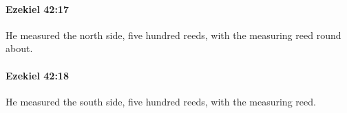 		\paragraph{Ezekiel 42:17} %
			\label{EZEKIEL-42-17}

			He measured the north side, five hundred reeds, with the measuring reed round about.


		\paragraph{Ezekiel 42:18} %
			\label{EZEKIEL-42-18}

			He measured the south side, five hundred reeds, with the measuring reed.


